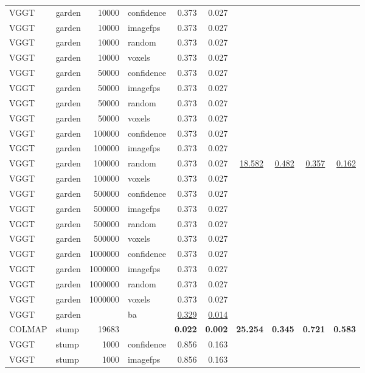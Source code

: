 \begin{table}[H]
\begin{tabular}{llrlrrrrrr}
VGGT & garden & 10000 & confidence & 0.373 & 0.027 &  &  &  &  \\
VGGT & garden & 10000 & imagefps & 0.373 & 0.027 &  &  &  &  \\
VGGT & garden & 10000 & random & 0.373 & 0.027 &  &  &  &  \\
VGGT & garden & 10000 & voxels & 0.373 & 0.027 &  &  &  &  \\
VGGT & garden & 50000 & confidence & 0.373 & 0.027 &  &  &  &  \\
VGGT & garden & 50000 & imagefps & 0.373 & 0.027 &  &  &  &  \\
VGGT & garden & 50000 & random & 0.373 & 0.027 &  &  &  &  \\
VGGT & garden & 50000 & voxels & 0.373 & 0.027 &  &  &  &  \\
VGGT & garden & 100000 & confidence & 0.373 & 0.027 &  &  &  &  \\
VGGT & garden & 100000 & imagefps & 0.373 & 0.027 &  &  &  &  \\
VGGT & garden & 100000 & random & 0.373 & 0.027 & \underline{18.582} & \underline{0.482} & \underline{0.357} & \underline{0.162} \\
VGGT & garden & 100000 & voxels & 0.373 & 0.027 &  &  &  &  \\
VGGT & garden & 500000 & confidence & 0.373 & 0.027 &  &  &  &  \\
VGGT & garden & 500000 & imagefps & 0.373 & 0.027 &  &  &  &  \\
VGGT & garden & 500000 & random & 0.373 & 0.027 &  &  &  &  \\
VGGT & garden & 500000 & voxels & 0.373 & 0.027 &  &  &  &  \\
VGGT & garden & 1000000 & confidence & 0.373 & 0.027 &  &  &  &  \\
VGGT & garden & 1000000 & imagefps & 0.373 & 0.027 &  &  &  &  \\
VGGT & garden & 1000000 & random & 0.373 & 0.027 &  &  &  &  \\
VGGT & garden & 1000000 & voxels & 0.373 & 0.027 &  &  &  &  \\
VGGT & garden &  & ba & \underline{0.329} & \underline{0.014} &  &  &  &  \\
\midrule
COLMAP & stump & 19683 &  & \textbf{0.022} & \textbf{0.002} & \textbf{25.254} & \textbf{0.345} & \textbf{0.721} & \textbf{0.583} \\
VGGT & stump & 1000 & confidence & 0.856 & 0.163 &  &  &  &  \\
VGGT & stump & 1000 & imagefps & 0.856 & 0.163 &  &  &  &  \\

\end{tabular}
\end{table}
